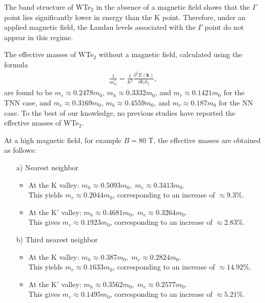 \documentclass{article}
\begin{document}
The band structure of WTe$_{2}$ in the absence of a magnetic field shows that the $\Gamma$ point lies significantly lower in energy than the K point. Therefore, under an applied magnetic field, the Landau levels associated with the $\Gamma$ point do not appear in this regime.

The effective masses of WTe$_{2}$ without a magnetic field, calculated using the formula
\begin{gather}
	\frac{1}{m_{ij}^*} = \frac{1}{\hbar^{2}} \frac{\partial^{2}E(\mathbf{k})}{\partial k_{i} k_{j}},
\end{gather}
are found to be $m_{e} \approx 0.2478 m_{0}$, $m_{h} \approx 0.3332 m_{0}$, and $m_{r} \approx 0.1421 m_{0}$ for the TNN case, and $m_{e} \approx 0.3169 m_{0}$, $m_{h} \approx 0.4559 m_{0}$, and $m_{r} \approx 0.187 m_{0}$ for the NN case. To the best of our knowledge, no previous studies have reported the effective masses of WTe$_{2}$.

At a high magnetic field, for example $B = 80$ T, the effective masses are obtained as follows:

\begin{itemize}
	\item[a)] Nearest neighbor
	      \begin{itemize}
		      \item At the K valley: $m_{h} \approx 0.5093 m_{0},\; m_{e} \approx 0.3413 m_{0}$. \\
		            This yields $m_{r} \approx 0.2044 m_{0}$, corresponding to an increase of $\approx 9.3\%$.

		      \item At the K$'$ valley: $m_{h} \approx 0.4681 m_{0},\; m_{e} \approx 0.3264 m_{0}$. \\
		            This gives $m_{r} \approx 0.1923 m_{0}$, corresponding to an increase of $\approx 2.83\%$.
	      \end{itemize}
	\item[b)] Third nearest neighbor
	      \begin{itemize}
		      \item At the K valley: $m_{h} \approx 0.387 m_{0},\; m_{e} \approx 0.2824 m_{0}$. \\
		            This yields $m_{r} \approx 0.1633 m_{0}$, corresponding to an increase of $\approx 14.92\%$.

		      \item At the K$'$ valley: $m_{h} \approx 0.3562 m_{0},\; m_{e} \approx 0.2577 m_{0}$. \\
		            This gives $m_{r} \approx 0.1495 m_{0}$, corresponding to an increase of $\approx 5.21\%$.
	      \end{itemize}
\end{itemize}
\end{document}
